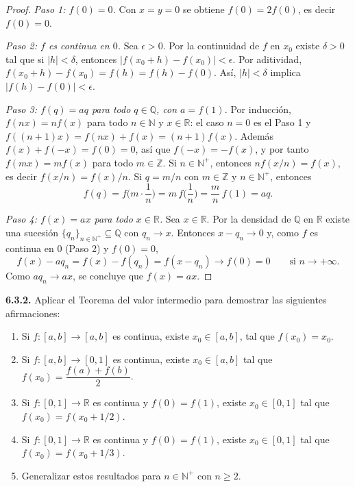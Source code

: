 \documentclass[11pt]{article}
\newcommand{\R}{\mathbb{R}}
\newcommand{\N}{\mathbb{N}}
\newcommand{\Q}{\mathbb{Q}}
\begin{document}
  \begin{proof}
  \emph{Paso 1: $f(0)=0$.} Con $x=y=0$ se obtiene $f(0)=2f(0)$, es decir $f(0)=0$.

  \emph{Paso 2: $f$ es continua en $0$.} Sea $\epsilon>0$. Por la continuidad de $f$ en $x_0$ existe $\delta>0$ tal que si $|h|<\delta$, entonces $|f(x_0+h)-f(x_0)|<\epsilon$. Por aditividad, $f(x_0+h)-f(x_0)=f(h)=f(h)-f(0)$. Así, $|h|<\delta$ implica $|f(h)-f(0)|<\epsilon$.

  \emph{Paso 3: $f(q)=aq$ para todo $q\in\Q$, con $a=f(1)$.} Por inducción, $f(nx)=nf(x)$ para todo $n\in\N$ y $x\in\R$: el caso $n=0$ es el Paso 1 y $f((n+1)x)=f(nx)+f(x)=(n+1)f(x)$. Además $f(x)+f(-x)=f(0)=0$, así que $f(-x)=-f(x)$, y por tanto $f(mx)=mf(x)$ para todo $m\in\mathbb Z$. Si $n\in\N^+$, entonces $nf(x/n)=f(x)$, es decir $f(x/n)=f(x)/n$. Si $q=m/n$ con $m\in\mathbb Z$ y $n\in\N^+$, entonces
  \[
  f(q)=f\Big(m\cdot\frac1n\Big)=m\,f\Big(\frac1n\Big)=\frac mn\,f(1)=aq.
  \]

  \emph{Paso 4: $f(x)=ax$ para todo $x\in\R$.} Sea $x\in\R$. Por la densidad de $\Q$ en $\R$ existe una sucesión $\{q_n\}_{n\in\N^+}\subseteq\Q$ con $q_n\to x$. Entonces $x-q_n\to 0$ y, como $f$ es continua en $0$ (Paso 2) y $f(0)=0$,
  \[
  f(x)-aq_n=f(x)-f(q_n)=f(x-q_n)\longrightarrow f(0)=0\qquad\text{si }n\to+\infty.
  \]
  Como $aq_n\to ax$, se concluye que $f(x)=ax$.
  \end{proof}

  \textbf{6.3.2.} Aplicar el Teorema del valor intermedio para demostrar las siguientes afirmaciones:
  \begin{enumerate}
  \item Si $f:[a,b]\to[a,b]$ es continua, existe $x_0\in[a,b]$, tal que $f(x_0)=x_0$.
  \item Si $f:[a,b]\to[0,1]$ es continua, existe $x_0\in[a,b]$ tal que $f(x_0)=\dfrac{f(a)+f(b)}{2}$.
  \item Si $f:[0,1]\to\R$ es continua y $f(0)=f(1)$, existe $x_0\in[0,1]$ tal que $f(x_0)=f(x_0+1/2)$.
  \item Si $f:[0,1]\to\R$ es continua y $f(0)=f(1)$, existe $x_0\in[0,1]$ tal que $f(x_0)=f(x_0+1/3)$.
  \item Generalizar estos resultados para $n\in\N^+$ con $n\ge 2$.
  \end{enumerate}
\end{document}
